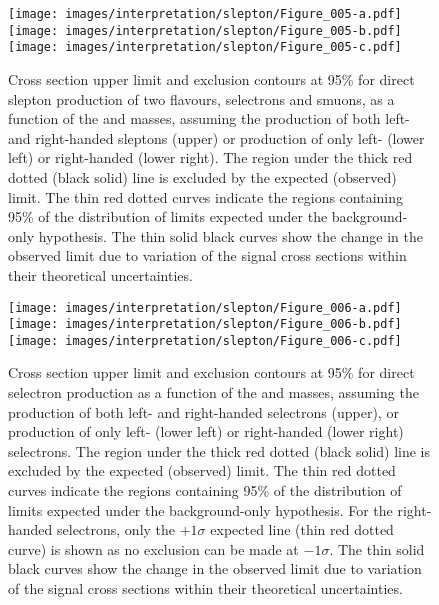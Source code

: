 \begin{figure}[htbp]
\centering
\texttt{[image: images/interpretation/slepton/Figure\_005-a.pdf]} \\
\texttt{[image: images/interpretation/slepton/Figure\_005-b.pdf]}
\texttt{[image: images/interpretation/slepton/Figure\_005-c.pdf]}
\caption{\label{fig:TOT}
Cross section upper limit and exclusion contours at 95\% \CL for direct slepton production of two flavours, selectrons and smuons,
as a function of the \lsp and \slep masses, assuming the production of both left- and right-handed sleptons
(upper) or production of only left- (lower left) or right-handed (lower right).
The region under the thick red dotted (black solid) line is excluded by the expected (observed) limit.
The thin red dotted curves indicate the regions containing 95\% of the distribution of limits
expected under the background-only hypothesis.
The thin solid black curves show the change in the observed limit due to
variation of the signal cross sections within their theoretical uncertainties.
}
\end{figure}
\begin{figure}[htbp]
\centering
\texttt{[image: images/interpretation/slepton/Figure\_006-a.pdf]} \\
\texttt{[image: images/interpretation/slepton/Figure\_006-b.pdf]}
\texttt{[image: images/interpretation/slepton/Figure\_006-c.pdf]}
\caption{\label{fig:TOTee}
Cross section upper limit and exclusion contours at 95\% \CL for direct selectron production
as a function of the \lsp and \slep masses, assuming the production of both left- and right-handed selectrons
(upper), or production of only left- (lower left) or right-handed (lower right) selectrons.
The region under the thick red dotted (black solid) line is excluded by the expected (observed) limit.
The thin red dotted curves indicate the regions containing 95\% of the distribution of limits
expected under the background-only hypothesis. For the right-handed selectrons, only the $+1\sigma$ expected line (thin red dotted curve) is shown as no exclusion can be made at $-1\sigma$.
The thin solid black curves show the change in the observed limit due to
variation of the signal cross sections within their theoretical uncertainties.
}
\end{figure}
